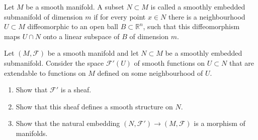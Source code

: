 \begin{definition}
\label{definition-smooth-embedded-submanifold}
Let $M$ be a smooth manifold. A subset
$N \subset M$ is called a smoothly embedded
submanifold of dimension $m$ if for every
point $x \in N$ there is a neighbourhood
$U \subset M$ diffeomorphic to an open ball
$B \subset \mathbb{R}^n$, such that this
diffeomorphism maps $U \cap N$ onto a linear
subspace of $B$ of dimension $m$.
\end{definition}

\begin{exercise}
\label{exercise-extend-sheaf-on-submanifold}
Let $(M,\mathcal{F})$ be a smooth manifold
and let $N \subset M$ be a smoothly embedded
submanifold. Consider the space
$\mathcal{F}'(U)$ of smooth functions on
$U \subset N$ that are extendable to
functions on $M$ defined on some
neighbourhood of $U$.
\begin{enumerate}
\item Show that $\mathcal{F}'$ is a sheaf.
\item Show that this sheaf defines a smooth
structure on $N$.
\item Show that the natural embedding
$(N,\mathcal{F}') \to (M,\mathcal{F})$ is a
morphism of manifolds.
\end{enumerate}
\end{exercise}

